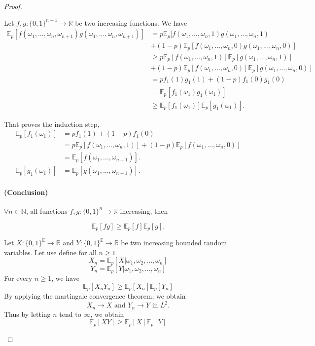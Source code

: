 \documentclass[a4paper,11pt]{article}
\theoremstyle{plain}
\theoremstyle{definition}
\theoremstyle{remark}
\begin{document}
\begin{proof}
\begin{enumerate}[(i)]
{        Let $f, g : \{ 0,1 \}^{n + 1} \longrightarrow \mathbb{R}$ be two increasing functions.
        We have
        \begin{align}
            \mathbb{E}_p[f(\omega_1,...,\omega_n,\omega_{n + 1})g(\omega_1,...,\omega_n,\omega_{n + 1})] &= 
            p \mathbb{E}_p[f(\omega_1,...,\omega_n,1)g(\omega_1,...,\omega_n,1) \nonumber \\  
            &+ (1 - p) \mathbb{E}_p[f(\omega_1,...,\omega_n,0)g(\omega_1,...,\omega_n,0)] \nonumber \\
            &\geq 
            p \mathbb{E}_p[f(\omega_1,...,\omega_n,1)]\mathbb{E}_p[g(\omega_1,...,\omega_n,1)] \nonumber \\
            &+ (1 - p) \mathbb{E}_p[f(\omega_1,...,\omega_n,0)]\mathbb{E}_p[g(\omega_1,...,\omega_n,0)] \nonumber \\
            &= p f_1(1) g_1(1) + (1 - p) f_1(0) g_1(0) \nonumber \\
            &= \mathbb{E}_p[f_1(\omega_{1})g_1(\omega_{1})] \nonumber \\ 
            &\geq \mathbb{E}_p[f_1(\omega_{1})]\mathbb{E}_p[g_1(\omega_{1})]. \label{eq:inequa_rec}
        \end{align}

        That proves the induction step, 
        \begin{align*}
        \mathbb{E}_p[f_1(\omega_{1})] &= p f_1(1) + (1-p) f_1(0) \\
        &= p \mathbb{E}_p[f(\omega_1, ..., \omega_n, 1)] + (1 - p) \mathbb{E}_p[f(\omega_1, ..., \omega_n, 0)] \\
        &= \mathbb{E}_p[f(\omega_1, ..., \omega_{n + 1})]. \\
        \mathbb{E}_p[g_1(\omega_{1})] &= \mathbb{E}_p[g(\omega_1, ..., \omega_{n + 1})].
        \end{align*}
        
        \paragraph{(Conclusion)}
        $\forall n \in \mathbb{N}$, all functions $f, g : \{ 0, 1 \}^n \longrightarrow \mathbb{R}$ increasing, then 
        
        \[\mathbb{E}_p[fg] \geq \mathbb{E}_p[f]\mathbb{E}_p[g].\]

    Let $X : \{ 0, 1 \} ^ \mathbb{E} \longrightarrow  \mathbb{R}$ and $Y : \{ 0, 1 \} ^ \mathbb{E} \longrightarrow  \mathbb{R}$ be two increasing bounded random variables. Let use define for all $n \geq 1$
    \[X_n = \mathbb{E}_p[X | \omega_1, \omega_2, ..., \omega_n]\]
    \[Y_n = \mathbb{E}_p[Y | \omega_1, \omega_2, ..., \omega_n]\]
    For every $n \geq 1$, we have
    \[\mathbb{E}_p[X_n Y_n] \geq \mathbb{E}_p[X_n] \mathbb{E}_p[Y_n]\]
    By applying the martingale convergence theorem, we obtain
    \[X_n \longrightarrow X \text{ and } Y_n \longrightarrow Y \text{ in } L^2. \]
    Thus by letting $n$ tend to $\infty$, we obtain
    \[\mathbb{E}_p[XY] \geq \mathbb{E}_p[X] \mathbb{E}_p[Y]\]
    }
\end{enumerate}
\end{proof}
\end{document}
